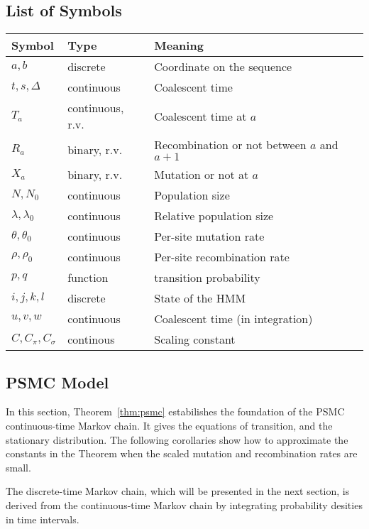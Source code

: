 \documentclass[pdftex,10pt]{article}
\begin{document}
\subsection{List of Symbols}
\begin{center}
\begin{tabular}{lll}
\hline
Symbol & Type & Meaning \\
\hline
$a,b$ & discrete & Coordinate on the sequence\\
$t,s,\Delta$ & continuous & Coalescent time \\
$T_a$ & continuous, r.v. & Coalescent time at $a$ \\
$R_a$ & binary, r.v. & Recombination or not between $a$ and $a+1$ \\
$X_a$ & binary, r.v. & Mutation or not at $a$ \\
$N,N_0$ & continuous & Population size \\
$\lambda,\lambda_0$ & continuous & Relative population size \\
$\theta,\theta_0$ & continuous & Per-site mutation rate \\
$\rho,\rho_0$ & continuous & Per-site recombination rate \\
$p,q$ & function & transition probability \\
$i,j,k,l$ & discrete & State of the HMM \\
$u,v,w$ & continuous & Coalescent time (in integration) \\
$C,C_{\pi},C_{\sigma}$ & continous & Scaling constant \\
\hline
\end{tabular}
\end{center}

\subsection{PSMC Model}

In this section, Theorem~\ref{thm:psmc} estabilishes the foundation of
the PSMC continuous-time Markov chain. It gives the equations of transition,
and the stationary distribution. The following corollaries
show how to approximate the constants in the Theorem when the scaled mutation
and recombination rates are small.

The discrete-time Markov chain, which will be presented in the next section,
is derived from the continuous-time Markov chain by integrating probability desities
in time intervals.
\end{document}
